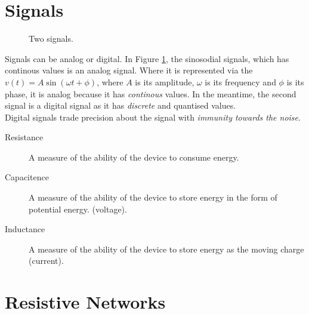 \documentclass[11pt,a4paper]{book}
\begin{document}
\section{Signals}
\begin{figure}[h]
\begin{subfigure}[b]{\textwidth}
\centering
{}
\end{subfigure}

\begin{subfigure}[b]{\textwidth}
\end{subfigure}
\caption{Two signals.}
\label{fig:signals}
\end{figure}

Signals can be analog or digital. In Figure \ref{fig:signals}, the sinosodial signals, which has continous values is an analog signal. Where it is represented via the $v(t) = A\sin(\omega t + \phi)$, where $A$ is its amplitude, $\omega$ is its frequency and $\phi$ is its phase, it is analog because it has \textit{continous} values. In the meantime, the second signal is a digital signal as it has \textit{discrete} and quantised values.\\

Digital signals trade precision about the signal with \textit{immunity towards the noise}.

\begin{description}
\item[Resistance] A measure of the ability of the device to consume energy.
\item[Capacitence] A measure of the ability of the device to store energy in the form of potential energy. (voltage).
\item[Inductance] A measure of the ability of the device to store energy as the moving charge (current).
\end{description}

\section{Resistive Networks}
\end{document}
